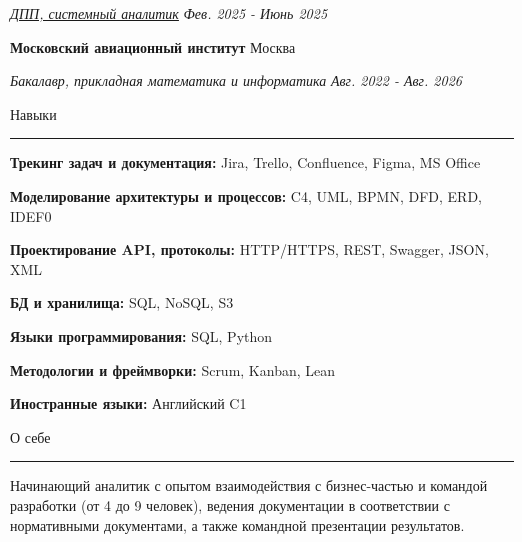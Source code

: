 \documentclass[14pt, a4paper, oneside]{extarticle}
\begin{document}
\begin{flushleft}
	\vspace{-\intextsep}
	\quad
	\href{https://github.com/Crazy5202/job_application_form/tree/main/portfolio/T1/%D0%A21_%D1%81%D0%B5%D1%80%D1%82%D0%B8%D1%84%D0%B8%D0%BA%D0%B0%D1%82.pdf}{\textit{ДПП, системный аналитик}}
	\hfill
	\textit{\small Фев. 2025 - Июнь 2025}
\end{flushleft}


\begin{flushleft}
	\vspace{-0.8\intextsep}
	\quad
	\textbf{Московский авиационный институт}
	\hfill
	Москва
\end{flushleft}

\begin{flushleft}
	\vspace{-\intextsep}
	\quad
	\textit{Бакалавр, прикладная математика и информатика}
	\hfill
	\textit{\small Авг. 2022 - Авг. 2026}
\end{flushleft}


\pagebreak


\begin{flushleft}
	\vspace{-\intextsep}
	\large Навыки
\end{flushleft}

\vspace{-0.8\intextsep}
\hrule


\vspace{0.5\intextsep}

\textbf{Трекинг задач и документация:} Jira, Trello, Confluence, Figma, MS Office

\textbf{Моделирование архитектуры и процессов:} C4, UML, BPMN, DFD, ERD, IDEF0

\textbf{Проектирование API, протоколы:} HTTP/HTTPS, REST, Swagger, JSON, XML

\textbf{БД и хранилища:} SQL, NoSQL, S3

\textbf{Языки программирования:} SQL, Python

\textbf{Методологии и фреймворки:} Scrum, Kanban, Lean

\textbf{Иностранные языки:} Английский C1


\begin{flushleft}
	\vspace{-\intextsep}
	\large О себе
\end{flushleft}

\vspace{-0.8\intextsep}
\hrule

\begin{sloppypar}
	\vspace{0.5\intextsep}
	\quad
	Начинающий аналитик с опытом взаимодействия с бизнес-частью и командой разработки (от 4 до 9 человек), ведения документации в соответствии с нормативными документами, а также командной презентации результатов.
\end{sloppypar}
\end{document}
